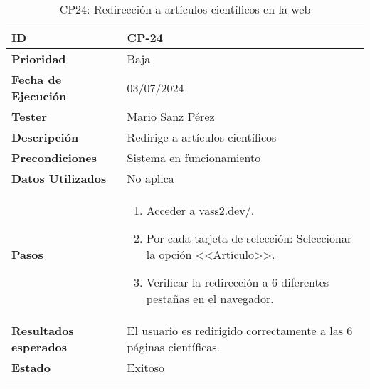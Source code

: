 \begin{longtable}{>{\raggedright\arraybackslash}p{4cm} p{9.5cm}}
    \hline
    \rowcolor{gray!20}
    \textbf{ID} & CP-24\\
    \hline
    \rowcolor{white}
    \textbf{Prioridad} & Baja \\
    \hline
    \rowcolor{gray!20}
    \textbf{Fecha de Ejecución} & 03/07/2024 \\
    \hline
    \rowcolor{white}
    \textbf{Tester} & Mario Sanz Pérez \\
    \hline
    \rowcolor{gray!20}
    \textbf{Descripción} & Redirige a artículos científicos\\
    \hline
    \rowcolor{white}
    \textbf{Precondiciones} & Sistema en funcionamiento\\
    \hline
    \rowcolor{white}
    \textbf{Datos Utilizados} & No aplica\\
    \hline
    \rowcolor{gray!20}
    \textbf{Pasos} & \begin{enumerate}
        \item Acceder a vass2.dev/.
        \item Por cada tarjeta de selección: Seleccionar la opción <<Artículo>>.
        \item Verificar la redirección a 6 diferentes pestañas en el navegador.
    \end{enumerate}\\
	\hline
    \rowcolor{gray!20}
    \textbf{Resultados esperados} & El usuario es redirigido correctamente a las 6 páginas científicas.\\
    \hline
    \rowcolor{white}
    \textbf{Estado} & Exitoso\\
    \hline
	\caption[CP24: Redirección a artículos]{CP24: Redirección a artículos científicos en la web}
\end{longtable}

